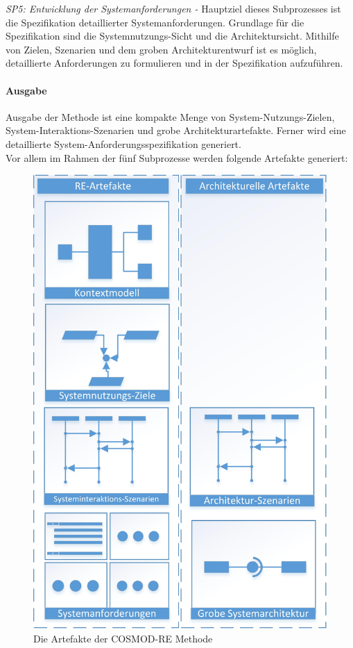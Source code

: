 \emph{SP5: Entwicklung der Systemanforderungen -}
Hauptziel dieses Subprozesses ist die Spezifikation detaillierter Systemanforderungen. Grundlage f\"ur die Spezifikation sind die Systemnutzungs-Sicht und die Architektursicht. Mithilfe von Zielen, Szenarien und dem groben Architekturentwurf ist es m\"oglich, detaillierte Anforderungen zu formulieren und in der Spezifikation aufzuf\"uhren.\\

\paragraph{Ausgabe}
Ausgabe der Methode ist eine kompakte Menge von System-Nutzungs-Zielen, System-Interaktions-Szenarien und grobe Architekturartefakte. Ferner wird eine detaillierte System-Anforderungsspezifikation generiert.\\

Vor allem im Rahmen der f\"unf Subprozesse werden folgende Artefakte generiert:\\

\begin{figure}[h]
	\centering
	\includegraphics[scale=0.8]{artefakte.jpg} 
	\caption{Die Artefakte der COSMOD-RE Methode}\label{art}
\end{figure}

